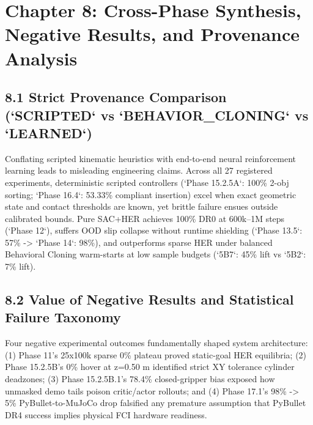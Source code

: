 \chapter{Chapter 8: Cross-Phase Synthesis, Negative Results, and Provenance Analysis}
\section{8.1 Strict Provenance Comparison (`SCRIPTED` vs `BEHAVIOR\_CLONING` vs `LEARNED`)}
Conflating scripted kinematic heuristics with end-to-end neural reinforcement learning leads to misleading engineering claims. Across all 27 registered experiments, deterministic scripted controllers (`Phase 15.2.5A`: 100\% 2-obj sorting; `Phase 16.4`: 53.33\% compliant insertion) excel when exact geometric state and contact thresholds are known, yet brittle failure ensues outside calibrated bounds. Pure SAC+HER achieves 100\% DR0 at 600k–1M steps (`Phase 12`), suffers OOD slip collapse without runtime shielding (`Phase 13.5`: 57\% -> `Phase 14`: 98\%), and outperforms sparse HER under balanced Behavioral Cloning warm-starts at low sample budgets (`5B7`: 45\% lift vs `5B2`: 7\% lift).

\section{8.2 Value of Negative Results and Statistical Failure Taxonomy}
Four negative experimental outcomes fundamentally shaped system architecture: (1) Phase 11's 25x100k sparse 0\% plateau proved static-goal HER equilibria; (2) Phase 15.2.5B's 0\% hover at z=0.50 m identified strict XY tolerance cylinder deadzones; (3) Phase 15.2.5B.1's 78.4\% closed-gripper bias exposed how unmasked demo tails poison critic/actor rollouts; and (4) Phase 17.1's 98\% -> 5\% PyBullet-to-MuJoCo drop falsified any premature assumption that PyBullet DR4 success implies physical FCI hardware readiness.

